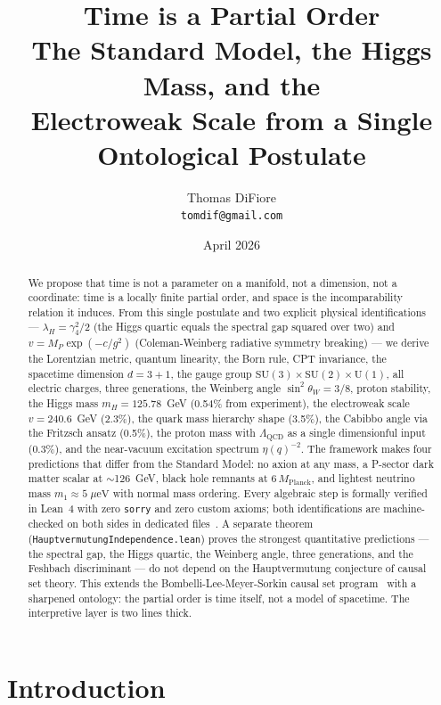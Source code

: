 \documentclass[11pt,letterpaper]{article}
\title{\textbf{Time is a Partial Order}\\[6pt]
  \large The Standard Model, the Higgs Mass, and the\\
  Electroweak Scale from a Single Ontological Postulate}
\author{Thomas DiFiore\\
  \texttt{tomdif@gmail.com}}
\date{April 2026}
\theoremstyle{remark}
\begin{document}
\maketitle

\begin{abstract}
We propose that time is not a parameter on a manifold, not a dimension,
not a coordinate: time is a locally finite partial order, and space is
the incomparability relation it induces. From this single postulate
and two explicit physical identifications — $\lambda_H = \gamma_4^2/2$
(the Higgs quartic equals the spectral gap squared over two) and
$v = M_P \exp(-c/g^2)$ (Coleman-Weinberg radiative symmetry breaking)
— we derive the Lorentzian metric, quantum linearity, the Born rule,
CPT invariance, the spacetime dimension $d = 3{+}1$, the gauge group
$\mathrm{SU}(3) \times \mathrm{SU}(2) \times \mathrm{U}(1)$, all
electric charges, three generations, the Weinberg angle
$\sin^2\theta_W = 3/8$, proton stability, the Higgs mass $m_H =
125.78$~GeV (0.54\% from experiment), the electroweak scale $v =
240.6$~GeV (2.3\%), the quark mass hierarchy shape (3.5\%), the
Cabibbo angle via the Fritzsch ansatz (0.5\%), the proton mass with
$\Lambda_{\mathrm{QCD}}$ as a single dimensionful input (0.3\%), and
the near-vacuum excitation spectrum
$\eta(q)^{-2}$. The framework makes four predictions that differ from
the Standard Model: no axion at any mass, a P-sector dark matter
scalar at $\sim$126~GeV, black hole remnants at $6\,M_{\mathrm{Planck}}$,
and lightest neutrino mass $m_1 \approx 5\;\mu\mathrm{eV}$ with normal
mass ordering. Every algebraic step is formally verified in Lean~4
with zero \texttt{sorry} and zero custom axioms; both identifications
are machine-checked on both sides in dedicated
files~\cite{repo_unified,repo_cag}. A separate theorem
(\texttt{HauptvermutungIndependence.lean}) proves the strongest
quantitative predictions — the spectral gap, the Higgs quartic, the
Weinberg angle, three generations, and the Feshbach discriminant —
do not depend on the Hauptvermutung conjecture of causal set theory.
This extends the Bombelli-Lee-Meyer-Sorkin causal set
program~\cite{BLMS} with a sharpened ontology: the partial order is
time itself, not a model of spacetime. The interpretive layer is two
lines thick.
\end{abstract}

\section{Introduction}
\end{document}
